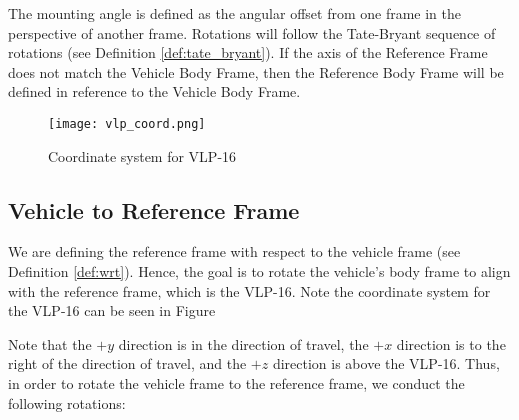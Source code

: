 \documentclass[11pt]{article}
\theoremstyle{definition}
\begin{document}
	The mounting angle is defined as the angular offset from one frame in the perspective of another frame. Rotations will follow the Tate-Bryant sequence of rotations (see Definition \ref{def:tate_bryant}).  If the axis of the Reference Frame does not match the Vehicle Body Frame, then the Reference Body Frame will be defined in reference to the Vehicle Body Frame. \par
	
	\begin{wrapfigure}{r}{5cm}
		\vspace{-30pt}
		\texttt{[image: vlp\_coord.png]}
		\caption{Coordinate system for VLP-16}
		\label{fig:coordinate_system}
	\end{wrapfigure}
	\subsection{Vehicle to Reference Frame}\label{subsec:vehicle_to_ref}
	We are defining the reference frame with respect to the vehicle frame (see Definition \ref{def:wrt}).  Hence, the goal is to rotate the vehicle's body frame to align with the reference frame, which is the VLP-16.  Note the coordinate system for the VLP-16 can be seen in Figure %
	
	
	
	
	
	
	
	
	\par Note that the $+y$ direction is in the direction of travel, the $+x$ direction is to the right of the direction of travel, and the $+z$ direction is above the VLP-16.   Thus, in order to rotate the vehicle frame to the reference frame, we conduct the following rotations:
	\pagebreak
	
\end{document}
